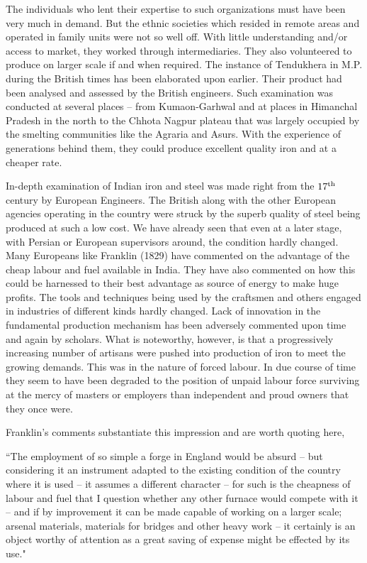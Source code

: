 \newpage

The individuals who lent their expertise to such organizations must have been very much in demand. But the ethnic societies which resided in remote areas and operated in family units were not so well off. With little understanding and/or access to market, they worked through intermediaries. They also volunteered to produce on larger scale if and when required. The instance of Tendukhera in M.P. during the British times has been elaborated upon earlier. Their product had been analysed and assessed by the British engineers. Such examination was conducted at several places – from Kumaon-Garhwal and at places in Himanchal Pradesh in the north to the Chhota Nagpur plateau that was largely occupied by the smelting communities like the Agraria and Asurs. With the experience of generations behind them, they could produce excellent quality iron and at a cheaper rate. 

In-depth examination of Indian iron and steel was made right from the $17^{\rm th}$ century by European Engineers. The British along with the other European agencies operating in the country were struck by the superb quality of steel being produced at such a low cost. We have already seen that even at a later stage, with Persian or European supervisors around, the condition hardly changed. Many Europeans like Franklin (1829) have commented on the advantage of the cheap labour and fuel available in India. They have also commented on how this could be harnessed to their best advantage as source of energy to make huge profits. The tools and techniques being used by the craftsmen and others engaged in industries of different kinds hardly changed. Lack of innovation in the fundamental production mechanism has been adversely commented upon time and again by scholars. What is noteworthy, however, is that a progressively increasing number of artisans were pushed into production of iron to meet the growing demands. This was in the nature of forced labour. In due course of time they seem to have been degraded to the position of unpaid labour force surviving at the mercy of masters or employers than independent and proud owners that they once were.

Franklin's comments substantiate this impression and are worth quoting here,


{\footnotesize{``The employment of so simple a forge in England would be absurd – but considering it an instrument adapted to the existing condition of the country where it is used – it assumes a different character – for such is the cheapness of labour and fuel that I question whether any other furnace would compete with it – and if by improvement it can be made capable of working on a larger scale; arsenal materials, materials for bridges and other heavy work – it certainly is an object worthy of attention as a great saving of expense might be effected by its use."}} 

